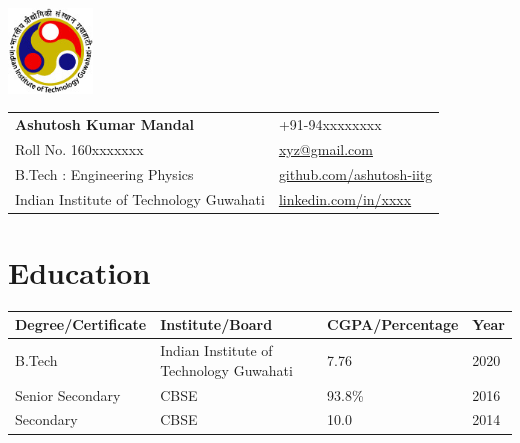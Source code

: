\documentclass[a4paper,11pt]{article}
\makeatletter
\newcommand{\resumeSubheading}[4]{
  \vspace{-1pt}\item
    \begin{tabular*}{0.97\textwidth}[t]{l@{\extracolsep{\fill}}r}
      \textbf{#1} & #2 \\
      \textit{\small#3} & \textit{\small #4} \\
    \end{tabular*}\vspace{-5pt}
}
\newcommand{\resumeSubHeadingListStart}{\begin{itemize}[leftmargin=*]}
\newcommand{\resumeSubHeadingListEnd}{\end{itemize}}
\makeatother
\begin{document}
\parbox{2.35cm}{%

\includegraphics[width=2.25cm,clip]{iitg_logo.jpg}

}\hspace{.1cm}\parbox{\dimexpr\linewidth-2.5cm\relax}{
\begin{tabu}to\linewidth{X[-1,l] X[-1,r]}
  \textbf{\LARGE Ashutosh Kumar Mandal} & +91-94xxxxxxxx\\
  {Roll No. 160xxxxxxx} & \href{mailto:xyz@gmail.com}{xyz@gmail.com}\\
  {B.Tech : Engineering Physics} &  \href{https://github.com/ashutosh-iitg}{github.com/ashutosh-iitg}\\
  {Indian Institute of Technology Guwahati} & \href{https://www.linkedin.com/in/xxxx/}{linkedin.com/in/xxxx}
\end{tabu}
}




\section{Education}
\setlength{\tabcolsep}{5pt} %
\begin{tabu}to\linewidth{|X[-1,c]| X[-1,c]| X[-1,c]| X[-1,c]|}
  \hline
  \textbf{Degree/Certificate } & \textbf{Institute/Board} & \textbf{CGPA/Percentage} & \textbf{Year}\\
  \hline
  B.Tech & Indian Institute of Technology Guwahati & 7.76 & 2020\\
  \hline
  Senior Secondary & CBSE & 93.8\% & 2016 \\
  \hline
  Secondary & CBSE & 10.0 & 2014\\
  \hline
\end{tabu}
\end{document}
